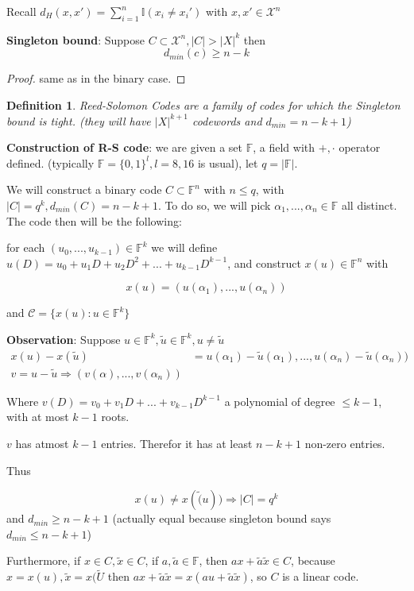 \documentclass{article}
\newtheorem{definition}{Definition}[section]
\theoremstyle{definition} %
\def\X{\mathcal{X}}
\def\F{\mathbb{F}}
\def\I{\mathbb{I}}
\def\C{\mathscr{C}}
\begin{document}
Recall $d_H(x, x') = \sum_{i = 1}^n \I(x_i \neq x_i')$ with $x, x'\in \X^n$

\textbf{Singleton bound}: Suppose $C \subset \X^n, |C| > |X|^k$ then
\[
  d_{min}(c) \geq n - k
\]

\begin{proof}
  same as in the binary case.
\end{proof}

\begin{definition}{Reed-Solomon Codes}
  are a family of codes for which the Singleton bound is tight. (they will have $|X|^{k+1}$ codewords and $d_{min} = n - k + 1$)
\end{definition}

\textbf{Construction of R-S code}: we are given a set $\F$, a field with $+, \cdot$ operator defined. (typically $\F = \{ 0, 1 \}^l, l = 8, 16$ is usual), let $q = |\F|$.

We will construct a binary code $C \subset \F^n$ with $n \leq q$, with $|C| = q^k, d_{min}(C) = n - k + 1$. To do so, we will pick $\alpha_1, ... , \alpha_n \in \F$ all distinct. The code then will be the following:

for each $(u_0, ..., u_{k-1}) \in \F^k$ we will define $u(D) = u_0 + u_1 D + u_2 D^2 + ... + u_{k-1} D^{k-1}$, and construct $x(u) \in \F^n$ with

\[
  x(u) = (u(\alpha_1), ..., u(\alpha_n))
\]

and $ \C = \{ x(u): u \in \F^k \}$

\textbf{Observation}: Suppose $u \in \F^k, \tilde{u} \in \F^k, u \neq \tilde{u}$
\begin{align*}
  x(u) - x(\tilde{u}) &= u(\alpha_1) - \tilde{u}(\alpha_1), ..., u(\alpha_n) - \tilde{u}(\alpha_n)) \\
  v = u - \tilde{u} \Rightarrow (v(\alpha), ..., v(\alpha_n))
\end{align*}

Where $v(D) = v_0 + v_1 D + ... + v_{k-1} D^{k-1}$ a polynomial of degree $\leq k-1$, with at most $k-1$ roots.

$v$ has atmost $k-1$ entries. Therefor it has at least $n - k + 1$ non-zero entries.

Thus

\[
  x(u) \neq x(\tilde(u)) \Rightarrow |C| = q^k
\]
and $d_{min} \geq n - k + 1$ (actually equal because singleton bound says $d_{min} \leq n - k + 1$)

Furthermore, if $x \in C, \tilde{x} \in C$, if $a, \tilde{a} \in \F$, then $ax + \tilde{a} \tilde{x} \in C$, because $x = x(u), \tilde{x} = x(\tilde{U}$ then $ax + \tilde{a} \tilde{x} = x(a u +  \tilde{a} \tilde{x})$, so $C$ is a linear code.
\end{document}
